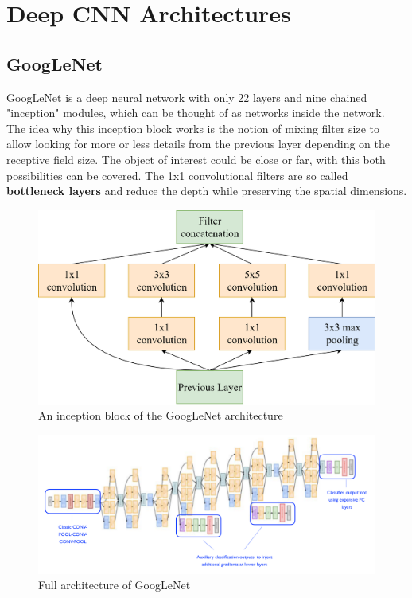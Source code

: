 \documentclass[11pt]{article}
\begin{document}
\section{Deep CNN Architectures}


\subsection{GoogLeNet}
GoogLeNet is a deep neural network with only 22 layers and nine chained "inception" modules, which can be thought of as networks inside the network. The idea why this inception block works is the notion of mixing filter size to allow looking for more or less details from the previous layer depending on the receptive field size. The object of interest could be close or far, with this both possibilities can be covered. The 1x1 convolutional filters are so called \textbf{bottleneck layers} and reduce the depth while preserving the spatial dimensions.

\begin{figure}[tbh]
	\centering
	\includegraphics[width=0.6\linewidth]{img/GoogLeNet_Inception}
	\caption{An inception block of the GoogLeNet architecture}
	\label{fig:googlenetinception}
\end{figure}

\begin{figure}[tbh]
	\centering
	\includegraphics[width=0.8\linewidth]{img/GoogLeNet_full}
	\caption{Full architecture of GoogLeNet}
	\label{fig:googlenetfull}
\end{figure}
\end{document}
